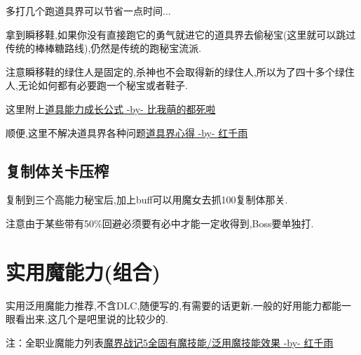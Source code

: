 		多打几个跑道具界可以节省一点时间...

		拿到瞬移鞋,如果你没有直接跑它的勇气就进它的道具界去偷秘宝(这里就可以跳过传统的棒棒糖路线),仍然是传统的跑秘宝流派.

		注意瞬移鞋的绿住人是固定的,杀神也不会取得新的绿住人,所以为了四十多个绿住人,无论如何都有必要跑一个秘宝或者鞋子.

		这里附上\href{http://tieba.baidu.com/f?kz=3834692385}{道具能力成长公式 -by- 比我萌的都死啦}

		顺便,这里不解决道具界各种问题\href{http://tieba.baidu.com/p/3730196003}{道具界心得 -by- 红千雨}


		\subsection{复制体关卡压榨}

		复制到三个高能力秘宝后,加上buff可以用魔女去抓100复制体那关.

		注意由于某些带有50\%回避必须要有必中才能一定收得到,Boss要单独打.
	
	\newpage

	\section{实用魔能力(组合)}

	实用泛用魔能力推荐,不含DLC,随便写的,有需要的话更新.一般的好用能力都能一眼看出来,这几个是吧里说的比较少的.

	注：全职业魔能力列表\href{http://tieba.baidu.com/p/3765501530}{魔界战记5全固有魔技能/泛用魔技能效果 -by- 红千雨}

